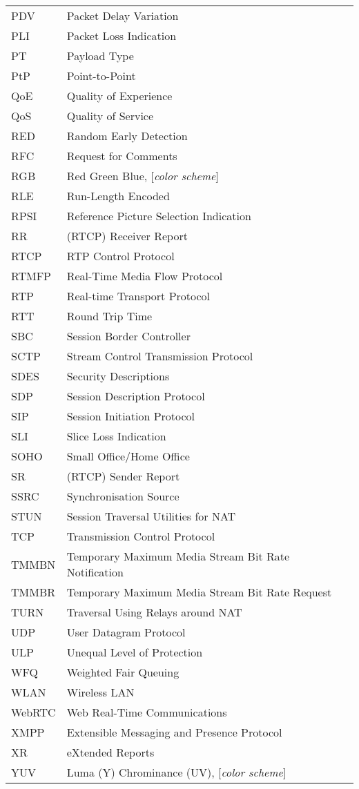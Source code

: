 \begin{longtable}{ll}
PDV  	& Packet Delay Variation \\
PLI 	& Packet Loss Indication \\
PT  	& Payload Type \\
PtP 	& Point-to-Point \\
QoE 	& Quality of Experience \\
QoS 	& Quality of Service \\
RED 	& Random Early Detection \\
RFC 	& Request for Comments \\
RGB 	& Red Green Blue, [\textit{color scheme}] \\
RLE  	& Run-Length Encoded \\
RPSI 	& Reference Picture Selection Indication \\
RR  	& (RTCP) Receiver Report \\
RTCP 	& RTP Control Protocol \\
RTMFP	& Real-Time Media Flow Protocol \\
RTP 	& Real-time Transport Protocol \\
RTT 	& Round Trip Time \\
SBC  	& Session Border Controller \\
SCTP 	& Stream Control Transmission Protocol  \\
SDES	& Security Descriptions \\
SDP 	& Session Description Protocol \\
SIP 	& Session Initiation Protocol \\
SLI 	& Slice Loss Indication \\
SOHO 	& Small Office/Home Office \\
SR  	& (RTCP) Sender Report \\
SSRC	& Synchronisation Source \\
STUN  	& Session Traversal Utilities for NAT \\
TCP 	& Transmission Control Protocol \\
TMMBN 	& Temporary Maximum Media Stream Bit Rate Notification \\
TMMBR 	& Temporary Maximum Media Stream Bit Rate Request \\
TURN  	& Traversal Using Relays around NAT \\
UDP 	& User Datagram Protocol \\
ULP 	& Unequal Level of Protection \\
WFQ 	& Weighted Fair Queuing \\
WLAN	& Wireless LAN \\
WebRTC	& Web Real-Time Communications \\
XMPP 	& Extensible Messaging and Presence Protocol \\
XR  	& eXtended Reports \\
YUV 	& Luma (Y) Chrominance (UV), [\textit{color scheme}] \\
\end{longtable}
